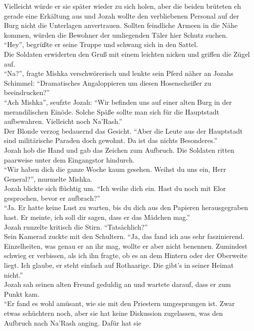 Vielleicht würde er sie später wieder zu sich holen, aber die beiden brüteten eh gerade eine 
Erkältung aus und Jozah wollte den verbliebenen Personal auf der Burg nicht die Unterlagen 
anvertrauen. Sollten feindliche Armeen in die Nähe kommen, würden die Bewohner der umliegenden 
Täler hier Schutz suchen.\\
``Hey'', begrüßte er seine Truppe und schwang sich in den Sattel.\\
Die Soldaten erwiderten den Gruß mit einem leichten nicken und griffen die Zügel auf.\\
``Na?'', fragte Mishka verschwörerisch und lenkte sein Pferd näher an Jozahs Schimmel: 
``Dramatisches Angaloppieren um diesen Hosenscheißer zu beeindrucken?''\\
``Ach Mishka'', seufzte Jozah: ``Wir befinden uns auf einer alten Burg in der merandilischen 
Einöde. Solche Späße sollte man sich für die Hauptstadt aufbewahren. Vielleicht noch Na'Rash.''\\
Der Blonde verzog bedauernd das Gesicht. ``Aber die Leute aus der Hauptstadt sind militärische 
Paraden doch gewohnt. Da ist das nichts Besonderes.''\\
Jozah hob die Hand und gab das Zeichen zum Aufbruch. Die Soldaten ritten paarweise unter dem 
Eingangstor hindurch.\\
``Wir haben dich die ganze Woche kaum gesehen. Weihst du uns ein, Herr General?'', murmelte 
Mishka.\\
Jozah blickte sich flüchtig um. ``Ich weihe dich ein. Hast du noch mit Elor gesprochen, bevor er 
aufbrach?''\\
``Ja. Er hatte keine Lust zu warten, bis du dich aus den Papieren herausgegraben hast. Er meinte, 
ich soll dir sagen, dass er das Mädchen mag.''\\
Jozah runzelte kritisch die Stirn. ``Tatsächlich?''\\
Sein Kamerad zuckte mit den Schultern. ``Ja, das fand ich aus sehr faszinierend. Einzelheiten, was 
genau er an ihr mag, wollte er aber nicht benennen. Zumindest schwieg er verbissen, als ich ihn 
fragte, ob es an dem Hintern oder der Oberweite liegt. Ich glaube, er steht einfach auf Rothaarige. 
Die gibt's in seiner Heimat nicht.''\\
Jozah sah seinen alten Freund geduldig an und wartete darauf, dass er zum Punkt kam.\\
``Er fand es wohl amüsant, wie sie mit den Priestern umgesprungen ist. Zwar etwas schüchtern noch, 
aber sie hat keine Diskussion zugelassen, was den Aufbruch nach Na'Rash anging. Dafür hat sie 
